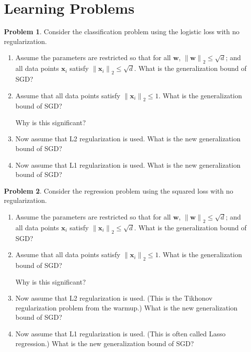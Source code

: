\documentclass[10pt]{article}
\theoremstyle{definition}
\newtheorem{problem}{Problem}
\newcommand{\w}{\mathbf w}
\newcommand{\x}{\mathbf x}
\newcommand{\ltwo}[1]{{\lVert {#1} \rVert}_2}
\begin{document}
\section{Learning Problems}
\begin{problem}
    Consider the classification problem using the logistic loss with no regularization.
    \begin{enumerate}
        \item 
            Assume the parameters are restricted so that for all $\w$, $\ltwo{\w}\le\sqrt d$;
            and all data points $\x_i$ satisfy $\ltwo{\x_i} \le \sqrt d$.
            What is the generalization bound of SGD?
            \vspace{4.5in}
        \item
            Assume that all data points satisfy $\ltwo{\x_i} \le 1$.
            What is the generalization bound of SGD?

            \vspace{1.5in}
            Why is this significant?
            \vspace{2.5in}
        \item 
            Now assume that L2 regularization is used.
            What is the new generalization bound of SGD?
            \newpage
        \item 
            Now assume that L1 regularization is used.
            What is the new generalization bound of SGD?
    \end{enumerate}
\end{problem}

\newpage
\begin{problem}
    Consider the regression problem using the squared loss with no regularization.
    \begin{enumerate}
        \item 
            Assume the parameters are restricted so that for all $\w$, $\ltwo{\w}\le\sqrt d$;
            and all data points $\x_i$ satisfy $\ltwo{\x_i} \le \sqrt d$.
            What is the generalization bound of SGD?
            \vspace{4.5in}
        \item
            Assume that all data points satisfy $\ltwo{\x_i} \le 1$.
            What is the generalization bound of SGD?

            \vspace{1.5in}
            Why is this significant?
            \vspace{2.5in}
        \item 
            Now assume that L2 regularization is used.
            (This is the Tikhonov regularization problem from the warmup.)
            What is the new generalization bound of SGD?
            \newpage
        \item 
            Now assume that L1 regularization is used.
            (This is often called Lasso regression.)
            What is the new generalization bound of SGD?
    \end{enumerate}
\end{problem}
\end{document}
